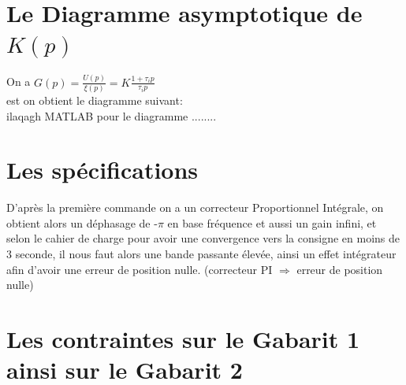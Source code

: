 \documentclass[12pt, a4paper, openany]{report}
\begin{document}
 
 \section{Le Diagramme asymptotique de $K(p)$ }  %
 
 On a  $G(p)=\frac {U(p)}{\xi(p)}=K\frac {1+\tau_{i}p}{\tau_{i}p}$\\
 
 est on obtient le diagramme suivant:\\
 
 ilaqagh MATLAB pour le diagramme ........
 
 
 \section{Les spécifications} %

 D’après la première commande on a un correcteur Proportionnel Intégrale, on obtient alors un déphasage de -$\pi$ en base fréquence et aussi un gain infini, et selon le cahier de charge pour avoir une convergence vers la consigne en moins de 3 seconde, il nous faut alors une bande passante élevée, ainsi un effet intégrateur afin d'avoir une erreur de position nulle. (correcteur PI $\Rightarrow$ erreur de position nulle)
 
 
 \section{Les contraintes sur le Gabarit 1 ainsi sur le Gabarit 2}  %
 
\end{document}
